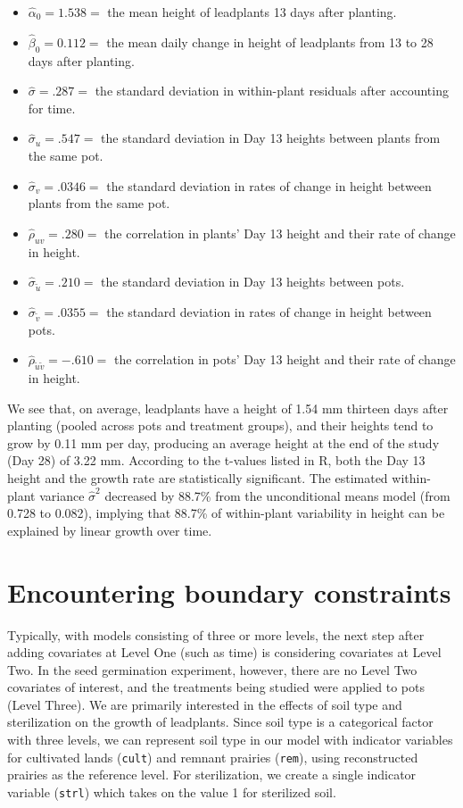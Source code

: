 \documentclass[
]{krantz}
\providecommand{\tightlist}{%
  \setlength{\itemsep}{0pt}\setlength{\parskip}{0pt}}
\begin{document}
\begin{itemize}
\tightlist
\item
  \(\hat{\alpha}_{0}=1.538=\) the mean height of leadplants 13 days after planting.
\item
  \(\hat{\beta}_{0}=0.112=\) the mean daily change in height of leadplants from 13 to 28 days after planting.
\item
  \(\hat{\sigma}=.287=\) the standard deviation in within-plant residuals after accounting for time.
\item
  \(\hat{\sigma}_{u}=.547=\) the standard deviation in Day 13 heights between plants from the same pot.
\item
  \(\hat{\sigma}_{v}=.0346=\) the standard deviation in rates of change in height between plants from the same pot.
\item
  \(\hat{\rho}_{uv}=.280=\) the correlation in plants' Day 13 height and their rate of change in height.
\item
  \(\hat{\sigma}_{\tilde{u}}=.210=\) the standard deviation in Day 13 heights between pots.
\item
  \(\hat{\sigma}_{\tilde{v}}=.0355=\) the standard deviation in rates of change in height between pots.
\item
  \(\hat{\rho}_{\tilde{u}\tilde{v}}=-.610=\) the correlation in pots' Day 13 height and their rate of change in height.
\end{itemize}

We see that, on average, leadplants have a height of 1.54 mm thirteen days after planting (pooled across pots and treatment groups), and their heights tend to grow by 0.11 mm per day, producing an average height at the end of the study (Day 28) of 3.22 mm. According to the t-values listed in R, both the Day 13 height and the growth rate are statistically significant. The estimated within-plant variance \(\hat{\sigma}^2\) decreased by 88.7\% from the unconditional means model (from 0.728 to 0.082), implying that 88.7\% of within-plant variability in height can be explained by linear growth over time.

\hypertarget{sec:boundary}{%
\section{Encountering boundary constraints}\label{sec:boundary}}

Typically, with models consisting of three or more levels, the next step after adding covariates at Level One (such as time) is considering covariates at Level Two. In the seed germination experiment, however, there are no Level Two covariates of interest, and the treatments being studied were applied to pots (Level Three). We are primarily interested in the effects of soil type and sterilization on the growth of leadplants. Since soil type is a categorical factor with three levels, we can represent soil type in our model with indicator variables for cultivated lands (\texttt{cult}) and remnant prairies (\texttt{rem}), using reconstructed prairies as the reference level. For sterilization, we create a single indicator variable (\texttt{strl}) which takes on the value 1 for sterilized soil.
\end{document}
